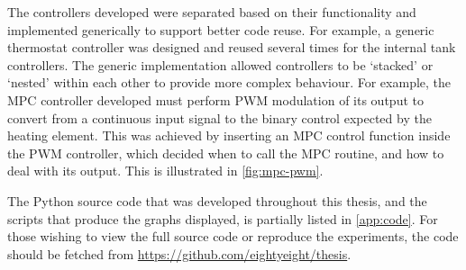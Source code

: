 The controllers developed were separated based on their functionality and implemented generically to support better code reuse.
For example, a generic thermostat controller was designed and reused several times for the internal tank controllers.
The generic implementation allowed controllers to be `stacked' or `nested' within each other to provide more complex behaviour.
For example, the MPC controller developed must perform PWM modulation of its output to convert from a continuous input signal to the binary control expected by the heating element.
This was achieved by inserting an MPC control function inside the PWM controller, which decided when to call the MPC routine, and how to deal with its output.
This is illustrated in \autoref{fig:mpc-pwm}.

The Python source code that was developed throughout this thesis, and the scripts that produce the graphs displayed, is partially listed in \autoref{app:code}.
For those wishing to view the full source code or reproduce the experiments, the code should be fetched from \url{https://github.com/eightyeight/thesis}.

